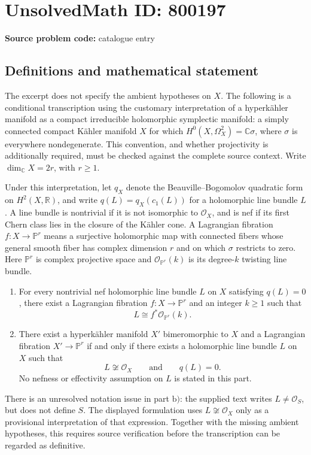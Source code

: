 \documentclass[11pt]{article}
\newcommand{\R}{\mathbb{R}}
\newcommand{\C}{\mathbb{C}}
\newcommand{\PP}{\mathbb{P}}
\begin{document}
\section*{UnsolvedMath ID: 800197}
\textbf{Source problem code:} catalogue entry
\subsection{Definitions and mathematical statement}
The excerpt does not specify the ambient hypotheses on \(X\). The following is a conditional transcription using the customary interpretation of a hyperk\"ahler manifold as a compact irreducible holomorphic symplectic manifold: a simply connected compact K\"ahler manifold \(X\) for which \(H^0(X,\Omega_X^2)=\C\sigma\), where \(\sigma\) is everywhere nondegenerate. This convention, and whether projectivity is additionally required, must be checked against the complete source context. Write \(\dim_{\C}X=2r\), with \(r\geq 1\).

Under this interpretation, let \(q_X\) denote the Beauville--Bogomolov quadratic form on \(H^2(X,\R)\), and write \(q(L)=q_X(c_1(L))\) for a holomorphic line bundle \(L\). A line bundle is nontrivial if it is not isomorphic to \(\mathcal O_X\), and is nef if its first Chern class lies in the closure of the K\"ahler cone. A Lagrangian fibration \(f:X\to\PP^r\) means a surjective holomorphic map with connected fibers whose general smooth fiber has complex dimension \(r\) and on which \(\sigma\) restricts to zero. Here \(\PP^r\) is complex projective space and \(\mathcal O_{\PP^r}(k)\) is its degree-\(k\) twisting line bundle.

\begin{enumerate}
\item[\(\mathrm{a)}\)] For every nontrivial nef holomorphic line bundle \(L\) on \(X\) satisfying \(q(L)=0\), there exist a Lagrangian fibration \(f:X\to\PP^r\) and an integer \(k\geq 1\) such that
\[
L\cong f^*\mathcal O_{\PP^r}(k).
\]
\item[\(\mathrm{b)}\)] There exist a hyperk\"ahler manifold \(X'\) bimeromorphic to \(X\) and a Lagrangian fibration \(X'\to\PP^r\) if and only if there exists a holomorphic line bundle \(L\) on \(X\) such that
\[
L\not\cong\mathcal O_X\qquad\text{and}\qquad q(L)=0.
\]
No nefness or effectivity assumption on \(L\) is stated in this part.
\end{enumerate}

There is an unresolved notation issue in part \(\mathrm{b)}\): the supplied text writes \(L\neq\mathcal O_S\), but does not define \(S\). The displayed formulation uses \(L\not\cong\mathcal O_X\) only as a provisional interpretation of that expression. Together with the missing ambient hypotheses, this requires source verification before the transcription can be regarded as definitive.
\end{document}
